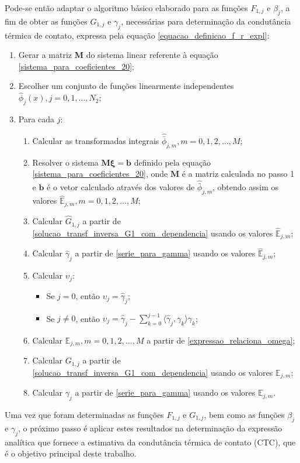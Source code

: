 Pode-se então adaptar o algoritmo básico elaborado para as funções $F_{1,j}$ e $\beta_j$, a fim de obter as funções $G_{1,j}$ e $\gamma_j$, necessárias para determinação da condutância térmica de contato, expressa pela equação \eqref{equacao_definicao_f_r_expl}:
\begin{enumerate}
	\item Gerar a matriz $\mathbf{M}$ do sistema linear referente à equação \eqref{sistema_para_coeficientes_20};
	\item Escolher um conjunto de funções linearmente independentes $\hat{\phi}_j(x), j=0,1,\ldots,N_2$;
	\item Para cada $j$:
	\begin{enumerate}	
		\item Calcular as transformadas integrais $\hat{\bar{\phi}}_{j,m}, m=0,1,2, \ldots, M$;
		\item Resolver o sistema $\mathbf{M}\mathbf{\xi} = \mathbf{b}$ definido pela equação \eqref{sistema_para_coeficientes_20}, onde $\mathbf{M}$ é a matriz calculada no passo 1 e $\mathbf{b}$ é o vetor calculado através dos valores de $\hat{\bar{\phi}}_{j,m}$, obtendo assim os valores $\hat{\mathbb{E}}_{j,m}, m=0,1,2, \ldots, M$;
		\item Calcular $\hat{G}_{1,j}$ a partir de \eqref{solucao_transf_inversa_G1_com_dependencia} usando os valores $\hat{\mathbb{E}}_{j,m}$;
		\item Calcular $\hat{\gamma}_j$ a partir de \eqref{serie_para_gamma} usando os valores $\hat{\mathbb{E}}_{j,m}$;
		\item Calcular $\upsilon_j$:
		\begin{itemize}
			\item Se $j = 0$, então $\upsilon_j = \hat{\gamma}_j$;
			\item Se $j \ne 0$, então $\upsilon_j = \hat{\gamma}_j - \displaystyle\sum_{k = 0}^{j - 1} \langle \hat{\gamma}_j, \gamma_k\rangle\gamma_k$;
		\end{itemize}
		\item Calcular $\mathbb{E}_{j,m}, m=0,1,2, \ldots, M$ a partir de \eqref{expressao_relaciona_omega};
		\item Calcular $G_{1,j}$ a partir de \eqref{solucao_transf_inversa_G1_com_dependencia} usando os valores $\mathbb{E}_{j,m}$;
		\item Calcular $\gamma_j$ a partir de \eqref{serie_para_gamma} usando os valores $\mathbb{E}_{j,m}$.
	\end{enumerate}
\end{enumerate}

Uma vez que foram determinadas as funções $F_{1,j}$ e $G_{1,j}$, bem como as funções $\beta_j$ e $\gamma_j$, o próximo passo é aplicar estes resultados na determinação da expressão analítica que fornece a estimativa da condutância térmica de contato (CTC), que é o objetivo principal deste trabalho.